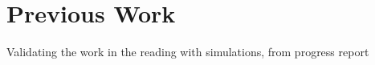 \chapter{Previous Work} \label{Chapter:two}
Validating the work in the reading with simulations, from progress report